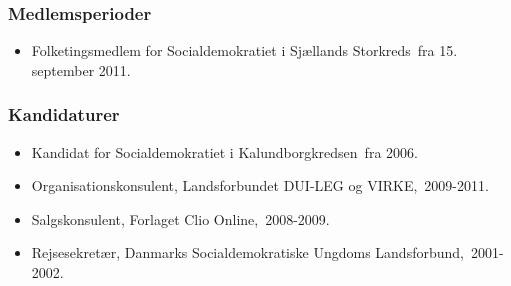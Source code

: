 \documentclass[11pt, a4paper]{awesome-cv}
\begin{document}
\begin{cvletter}
\subsubsection*{Medlemsperioder}
\begin{itemize}
\item Folketingsmedlem for Socialdemokratiet i Sjællands Storkreds fra 15. september 2011.
\end{itemize}
\subsubsection*{Kandidaturer}
\begin{itemize}
\item Kandidat for Socialdemokratiet i Kalundborgkredsen fra 2006.
\end{itemize}
\begin{itemize}
\item Organisationskonsulent, Landsforbundet DUI-LEG og VIRKE, 2009-2011.
\item Salgskonsulent, Forlaget Clio Online, 2008-2009.
\item Rejsesekretær, Danmarks Socialdemokratiske Ungdoms Landsforbund, 2001-2002.
\end{itemize}
\end{cvletter}
\end{document}
